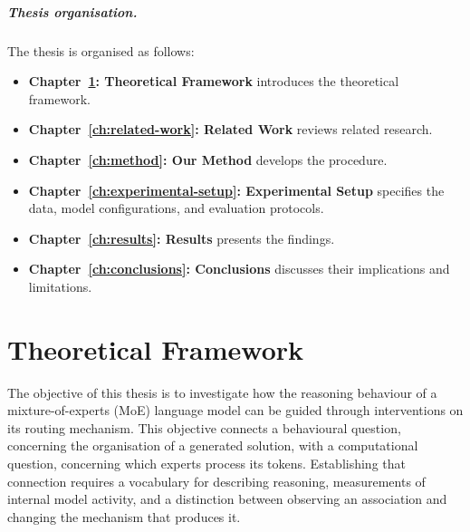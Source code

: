 \documentclass[12pt,a4paper,twoside,openright]{book}
\begin{document}
\paragraph{Thesis organisation.}
The thesis is organised as follows:
\begin{itemize}
    \item \textbf{Chapter~\ref{ch:theoretical-framework}: Theoretical Framework} introduces the theoretical framework.

    \item \textbf{Chapter~\ref{ch:related-work}: Related Work} reviews related research.

    \item \textbf{Chapter~\ref{ch:method}: Our Method} develops the procedure.

    \item \textbf{Chapter~\ref{ch:experimental-setup}: Experimental Setup} specifies the data, model configurations,
    and evaluation protocols.

    \item \textbf{Chapter~\ref{ch:results}: Results} presents the findings.

    \item \textbf{Chapter~\ref{ch:conclusions}: Conclusions} discusses their implications and limitations.
\end{itemize}

\newpage
\tableofcontents

\newpage
\listoffigures

\newpage
\listoftables

\mainmatter

\pagestyle{fancy}
\fancyhead[LO]{\nouppercase{\rightmark}}
\fancyhead[RE]{\nouppercase{\leftmark}}
\fancyhead[LE,RO]{\thepage}
\fancyfoot{}

\chapter{Theoretical Framework}
\label{ch:theoretical-framework}

The objective of this thesis is to investigate how the reasoning behaviour of
a mixture-of-experts (MoE) language model can be guided through interventions
on its routing mechanism. This objective connects a behavioural question,
concerning the organisation of a generated solution, with a computational
question, concerning which experts process its tokens. Establishing that
connection requires a vocabulary for describing reasoning, measurements of
internal model activity, and a distinction between observing an association
and changing the mechanism that produces it.
\end{document}
